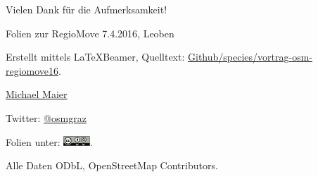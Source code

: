\documentclass{beamer}
\begin{document}
\begin{frame}{Vielen Dank für die Aufmerksamkeit!}

  Folien zur RegioMove 7.4.2016, Leoben
\vspace{1cm}

Erstellt mittels \LaTeX Beamer, Quelltext: \href{https://github.com/species/vortrag-osm-regiomove16}{Github/species/vortrag-osm-regiomove16}.
\vspace{1cm}

\href{mailto:michael.maier@mailbox.org}{Michael Maier}

Twitter: \href{https://twitter.com/osmgraz}{@osmgraz}
\vspace{1cm}

Folien unter: \includegraphics[width=1cm]{cc-by-sa.pdf}. 

Alle Daten ODbL, OpenStreetMap Contributors.

\end{frame}
\end{document}
